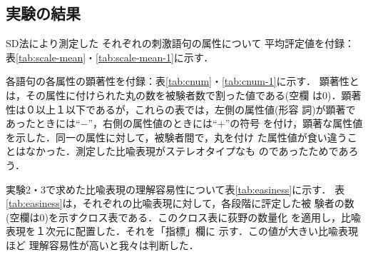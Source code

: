 \subsection{実験の結果}
\label{sec:sd-hiyu-results}

SD法により測定した それぞれの刺激語句の属性について 平均評定値を付録：
表\ref{tab:scale-mean}・\ref{tab:scale-mean-1}に示す．

各語句の各属性の顕著性を付録：表\ref{tab:cnum}・\ref{tab:cnum-1}に示す．
顕著性とは，その属性に付けられた丸の数を被験者数で割った値である(空欄
は0)．顕著性は０以上１以下であるが，これらの表では，左側の属性値(形容
詞)が顕著であったときには``$-$''，右側の属性値のときには``$+$''の符号
を付け，顕著な属性値を示した．同一の属性に対して，被験者間で，丸を付け
た属性値が食い違うことはなかった．測定した比喩表現がステレオタイプなも
のであったためであろう．

実験2・3で求めた比喩表現の理解容易性について表\ref{tab:easiness}に示す．
表\ref{tab:easiness}は，それぞれの比喩表現に対して，各段階に評定した被
験者の数(空欄は0)を示すクロス表である．このクロス表に荻野の数量化
\cite{Ogino83}を適用し，比喩表現を１次元に配置した．それを「指標」欄に
示す．この値が大きい比喩表現ほど 理解容易性が高いと我々は判断した．

